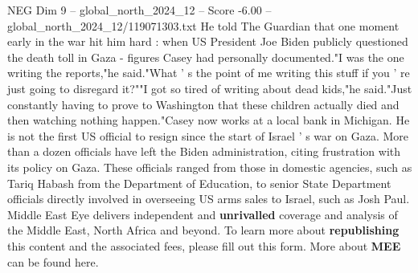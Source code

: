 \begin{textsample}{NEG Dim 9 – global\_north\_2024\_12 – Score -6.00 – global\_north\_2024\_12/119071303.txt}
He told The Guardian that one moment early in the war hit him hard : when US President Joe Biden publicly questioned the death toll in Gaza - figures Casey had personally documented."I was the one writing the reports,"he said."What ' s the point of me writing this stuff if you ' re just going to disregard it?""I got so tired of writing about dead kids,"he said."Just constantly having to prove to Washington that these children actually died and then watching nothing happen."Casey now works at a local bank in Michigan.
He is not the first US official to resign since the start of Israel ' s war on Gaza.
More than a dozen officials have left the Biden administration, citing frustration with its policy on Gaza.
These officials ranged from those in domestic agencies, such as Tariq Habash from the Department of Education, to senior State Department officials directly involved in overseeing US arms sales to Israel, such as Josh Paul.
Middle East Eye delivers independent and \textbf{unrivalled} coverage and analysis of the Middle East, North Africa and beyond.
To learn more about \textbf{republishing} this content and the associated fees, please fill out this form.
More about \textbf{MEE} can be found here.

\end{textsample}
